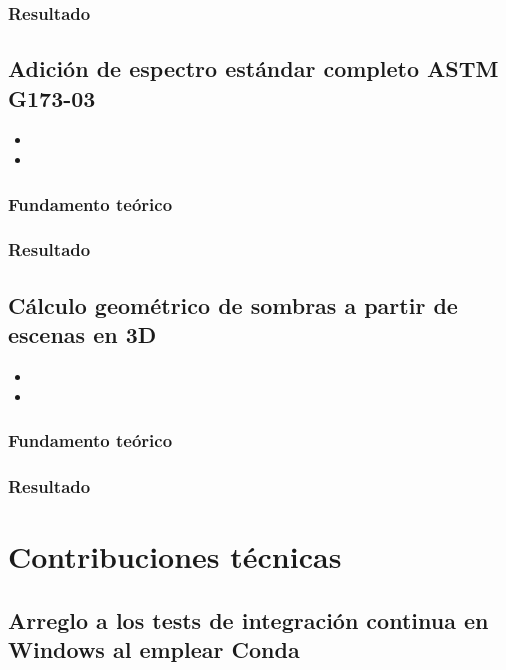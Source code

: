 \subsubsection{Resultado}

\subsection{Adición de espectro estándar completo ASTM G173-03}

\begin{itemize}
    \item {}
    \item {}
\end{itemize}

\subsubsection{Fundamento teórico}

\subsubsection{Resultado}

\subsection{Cálculo geométrico de sombras a partir de escenas en 3D}

\begin{itemize}
    \item {}
    \item {}
\end{itemize}
\subsubsection{Fundamento teórico}

\subsubsection{Resultado}

\section{Contribuciones técnicas} \label{sct:desarrollo:contribuciones_tecnicas}

\subsection{Arreglo a los tests de integración continua en Windows al emplear Conda}


